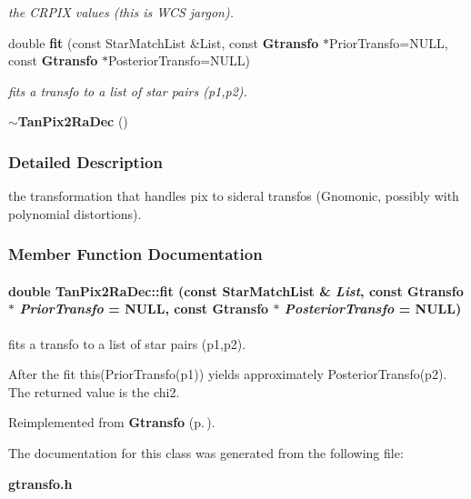 \begin{CompactItemize}
\begin{CompactList}\small\item\em the CRPIX values (this is WCS jargon).\item\end{CompactList}\item 
double {\bf fit} (const Star\-Match\-List \&List, const {\bf Gtransfo} $\ast$Prior\-Transfo=NULL, const {\bf Gtransfo} $\ast$Posterior\-Transfo=NULL)
\begin{CompactList}\small\item\em fits a transfo to a list of star pairs (p1,p2).\item\end{CompactList}\item 
{}
{\bf $\sim$Tan\-Pix2Ra\-Dec} ()\label{class_tanpix2radec_a18}

\end{CompactItemize}


\subsubsection{Detailed Description}
the transformation that handles pix to sideral transfos (Gnomonic, possibly with polynomial distortions).



\subsubsection{Member Function Documentation}
\paragraph{\setlength{\rightskip}{0pt plus 5cm}double Tan\-Pix2Ra\-Dec::fit (const Star\-Match\-List \& {\em List}, const {\bf Gtransfo} $\ast$ {\em Prior\-Transfo} = NULL, const {\bf Gtransfo} $\ast$ {\em Posterior\-Transfo} = NULL)\hspace{0.3cm}{\tt  [virtual]}}\hfill\label{class_tanpix2radec_a17}


fits a transfo to a list of star pairs (p1,p2).

After the fit this(Prior\-Transfo(p1)) yields approximately Posterior\-Transfo(p2). The returned value is the chi2. 

Reimplemented from {\bf Gtransfo} {\rm (p.\,\pageref{class_gtransfo_a4})}.

The documentation for this class was generated from the following file:\begin{CompactItemize}
\item 
{\bf gtransfo.h}\end{CompactItemize}
